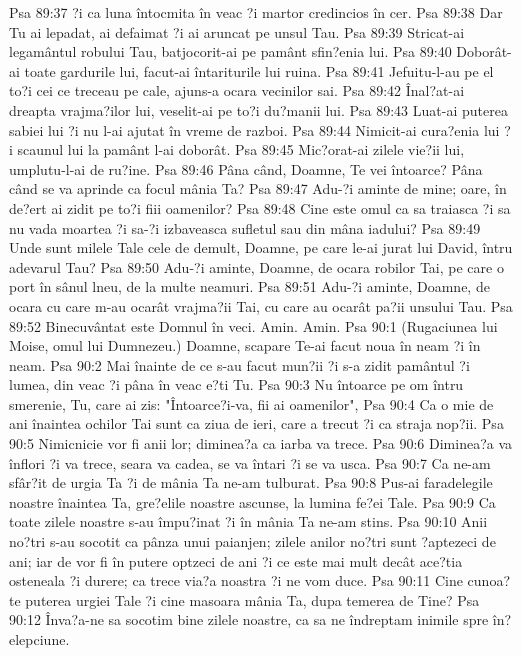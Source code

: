 Psa 89:37  ?i ca luna întocmita în veac ?i martor credincios în cer.
Psa 89:38  Dar Tu ai lepadat, ai defaimat ?i ai aruncat pe unsul Tau.
Psa 89:39  Stricat-ai legamântul robului Tau, batjocorit-ai pe pamânt sfin?enia lui.
Psa 89:40  Doborât-ai toate gardurile lui, facut-ai întariturile lui ruina.
Psa 89:41  Jefuitu-l-au pe el to?i cei ce treceau pe cale, ajuns-a ocara vecinilor sai.
Psa 89:42  Înal?at-ai dreapta vrajma?ilor lui, veselit-ai pe to?i du?manii lui.
Psa 89:43  Luat-ai puterea sabiei lui ?i nu l-ai ajutat în vreme de razboi.
Psa 89:44  Nimicit-ai cura?enia lui ?i scaunul lui la pamânt l-ai doborât.
Psa 89:45  Mic?orat-ai zilele vie?ii lui, umplutu-l-ai de ru?ine.
Psa 89:46  Pâna când, Doamne, Te vei întoarce? Pâna când se va aprinde ca focul mânia Ta?
Psa 89:47  Adu-?i aminte de mine; oare, în de?ert ai zidit pe to?i fiii oamenilor?
Psa 89:48  Cine este omul ca sa traiasca ?i sa nu vada moartea ?i sa-?i izbaveasca sufletul sau din mâna iadului?
Psa 89:49  Unde sunt milele Tale cele de demult, Doamne, pe care le-ai jurat lui David, întru adevarul Tau?
Psa 89:50  Adu-?i aminte, Doamne, de ocara robilor Tai, pe care o port în sânul lneu, de la multe neamuri.
Psa 89:51  Adu-?i aminte, Doamne, de ocara cu care m-au ocarât vrajma?ii Tai, cu care au ocarât pa?ii unsului Tau.
Psa 89:52  Binecuvântat este Domnul în veci. Amin. Amin.
Psa 90:1  (Rugaciunea lui Moise, omul lui Dumnezeu.) Doamne, scapare Te-ai facut noua în neam ?i în neam.
Psa 90:2  Mai înainte de ce s-au facut mun?ii ?i s-a zidit pamântul ?i lumea, din veac ?i pâna în veac e?ti Tu.
Psa 90:3  Nu întoarce pe om întru smerenie, Tu, care ai zis: "Întoarce?i-va, fii ai oamenilor",
Psa 90:4  Ca o mie de ani înaintea ochilor Tai sunt ca ziua de ieri, care a trecut ?i ca straja nop?ii.
Psa 90:5  Nimicnicie vor fi anii lor; diminea?a ca iarba va trece.
Psa 90:6  Diminea?a va înflori ?i va trece, seara va cadea, se va întari ?i se va usca.
Psa 90:7  Ca ne-am sfâr?it de urgia Ta ?i de mânia Ta ne-am tulburat.
Psa 90:8  Pus-ai faradelegile noastre înaintea Ta, gre?elile noastre ascunse, la lumina fe?ei Tale.
Psa 90:9  Ca toate zilele noastre s-au împu?inat ?i în mânia Ta ne-am stins.
Psa 90:10  Anii no?tri s-au socotit ca pânza unui paianjen; zilele anilor no?tri sunt ?aptezeci de ani; iar de vor fi în putere optzeci de ani ?i ce este mai mult decât ace?tia osteneala ?i durere; ca trece via?a noastra ?i ne vom duce.
Psa 90:11  Cine cunoa?te puterea urgiei Tale ?i cine masoara mânia Ta, dupa temerea de Tine?
Psa 90:12  Înva?a-ne sa socotim bine zilele noastre, ca sa ne îndreptam inimile spre în?elepciune.
